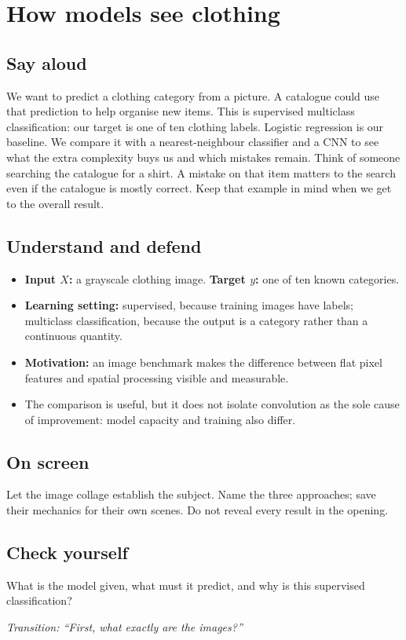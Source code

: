 \documentclass[11pt,a4paper]{article}
\newcommand{\slide}[3]{\clearpage{\small\color{olive}SLIDE #1\hfill Target: #3}\par\section{#2}}
\newcommand{\say}{\subsection{Say aloud}}
\newcommand{\understand}{\subsection{Understand and defend}}
\newcommand{\screen}{\subsection{On screen}}
\newcommand{\selfcheck}[1]{\subsection{Check yourself}#1}
\newcommand{\transition}[1]{\par\smallskip\textit{Transition: #1}}
\begin{document}
\slide{1}{How models see clothing}{45 seconds}
\say
We want to predict a clothing category from a picture. A catalogue could use that prediction to help organise new items. This is supervised multiclass classification: our target is one of ten clothing labels. Logistic regression is our baseline. We compare it with a nearest-neighbour classifier and a CNN to see what the extra complexity buys us and which mistakes remain. Think of someone searching the catalogue for a shirt. A mistake on that item matters to the search even if the catalogue is mostly correct. Keep that example in mind when we get to the overall result.
\understand
\begin{itemize}
\item \textbf{Input $X$:} a grayscale clothing image. \textbf{Target $y$:} one of ten known categories.
\item \textbf{Learning setting:} supervised, because training images have labels; multiclass classification, because the output is a category rather than a continuous quantity.
\item \textbf{Motivation:} an image benchmark makes the difference between flat pixel features and spatial processing visible and measurable.
\item The comparison is useful, but it does not isolate convolution as the sole cause of improvement: model capacity and training also differ.
\end{itemize}
\screen
Let the image collage establish the subject. Name the three approaches; save their mechanics for their own scenes. Do not reveal every result in the opening.
\selfcheck{What is the model given, what must it predict, and why is this supervised classification?}
\transition{``First, what exactly are the images?''}
\end{document}
